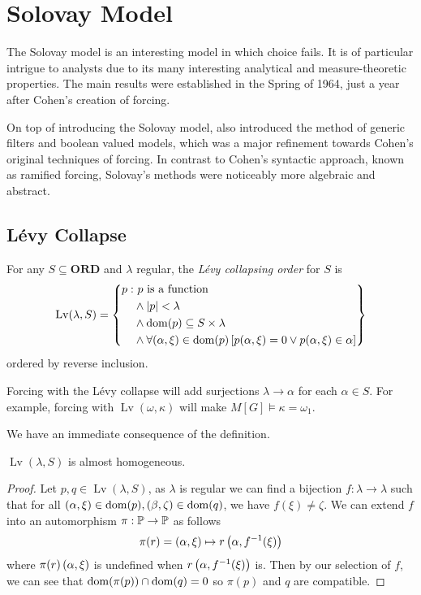 \chapter{Solovay Model}

The Solovay model is an interesting model in which choice fails.
It is of particular intrigue to analysts due to its many interesting analytical and measure-theoretic properties.
The main results were established in the Spring of 1964, just a year after Cohen's creation of forcing.

On top of introducing the Solovay model, \autocite{solovay1970} also introduced the method of generic filters and boolean valued models,
which was a major refinement towards Cohen's original techniques of forcing.
In contrast to Cohen's syntactic approach, known as ramified forcing, Solovay's methods were noticeably more algebraic and abstract.

\section{Lévy Collapse}

\newcommand*{\Lv}{\operatorname{Lv}}
\begin{definition}
    For any \(S\subseteq \mathbf{ORD}\) and \(\lambda\) regular, the \emph{Lévy collapsing order} for \(S\) is
    \[
        \Lv(\lambda, S) = \set{
            \begin{split}
                p: &\ p\text{ is a function} \\
                   &\land \abs{p} < \lambda \\
                   &\land \dom(p) \subseteq S\times\lambda \\
                   &\land \forall (\alpha,\xi)\in\dom(p)\sq{p(\alpha,\xi) = 0 \lor p(\alpha,\xi)\in \alpha}
            \end{split}
        }
    \]
    ordered by reverse inclusion.
\end{definition}
\begin{remark}
    Forcing with the Lévy collapse will add surjections \(\lambda\to\alpha\) for each \(\alpha\in S\).
    For example, forcing with \(\Lv(\omega,\kappa)\) will make \(M[G]\models \kappa = \omega_1\).
\end{remark}

We have an immediate consequence of the definition.
\begin{proposition}
    \(\Lv(\lambda,S)\) is almost homogeneous.
\end{proposition}
\begin{proof}
    Let \(p,q\in\Lv(\lambda,S)\), as \(\lambda\) is regular we can find a bijection \(f:\lambda\to\lambda\) such that
    for all \((\alpha,\xi)\in\dom(p), (\beta,\zeta)\in\dom(q)\), we have \(f(\xi) \ne \zeta\).
    We can extend \(f\) into an automorphism \(\pi:\P\to\P\) as follows
    \[ \pi(r) = \paren{\alpha,\xi}\mapsto r\paren{\alpha, f^{-1}(\xi)} \]
    where \(\pi(r)\paren{\alpha,\xi}\) is undefined when \(r\paren{\alpha,f^{-1}(\xi)}\) is.
    Then by our selection of \(f\), we can see that \(\dom(\pi(p)) \cap\dom(q) = 0\) so \(\pi(p)\) and \(q\) are compatible.
\end{proof}

